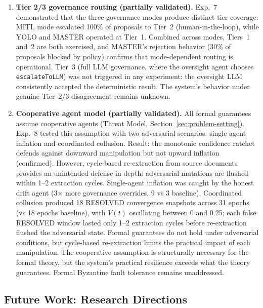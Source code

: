\documentclass[11pt]{article}
\begin{document}
\begin{enumerate}
  \item \textbf{Tier 2/3 governance routing (partially validated).} Exp.~7 demonstrated that the three governance modes produce distinct tier coverage: MITL mode escalated 100\% of proposals to Tier~2 (human-in-the-loop), while YOLO and MASTER operated at Tier~1. Combined across modes, Tiers~1 and~2 are both exercised, and MASTER's rejection behavior (30\% of proposals blocked by policy) confirms that mode-dependent routing is operational. Tier~3 (full LLM governance, where the oversight agent chooses \texttt{escalateToLLM}) was not triggered in any experiment: the oversight LLM consistently accepted the deterministic result. The system's behavior under genuine Tier~2/3 disagreement remains unknown.

  \item \textbf{Cooperative agent model (partially validated).} All formal guarantees assume cooperative agents (Threat Model, Section~\ref{sec:problem-setting}). Exp.~8 tested this assumption with two adversarial scenarios: single-agent inflation and coordinated collusion. Result: the monotonic confidence ratchet defends against downward manipulation but not upward inflation (confirmed). However, cycle-based re-extraction from source documents provides an unintended defense-in-depth: adversarial mutations are flushed within 1--2 extraction cycles. Single-agent inflation was caught by the honest drift agent (3$\times$ more governance overrides, 9 vs 3 baseline). Coordinated collusion produced 18 RESOLVED convergence snapshots across 31 epochs (vs 18 epochs baseline), with $V(t)$ oscillating between 0 and 0.25; each false RESOLVED window lasted only 1--2 extraction cycles before re-extraction flushed the adversarial state. Formal guarantees do not hold under adversarial conditions, but cycle-based re-extraction limits the practical impact of each manipulation. The cooperative assumption is structurally necessary for the formal theory, but the system's practical resilience exceeds what the theory guarantees. Formal Byzantine fault tolerance \cite{lamport1982,castro1999} remains unaddressed.
\end{enumerate}

\subsection{Future Work: Research Directions}
\end{document}
